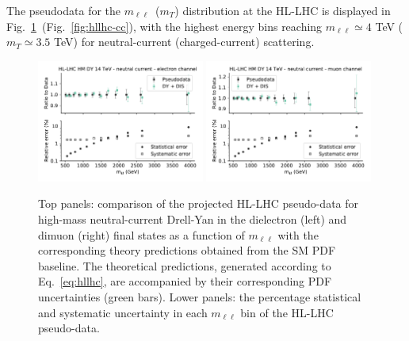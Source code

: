 \documentclass[withindex,glossary]{cam-thesis}
\begin{document}
The pseudodata for the $m_{\ell\ell}$~($m_T$) distribution at the HL-LHC
is displayed in Fig.~\ref{fig:hllhc-nc}~(Fig.~\ref{fig:hllhc-cc}),
with the highest energy bins reaching $m_{\ell\ell}\simeq 4 $ TeV
($m_T\simeq 3.5$ TeV) for neutral-current (charged-current) scattering.

\begin{figure}[t]
\begin{center}
  \includegraphics[width=0.49\textwidth]{dy_figures/HLLHC_HMDY_NC_EL_FINAL_plot_error_breakdown_0.pdf}
  \includegraphics[width=0.49\textwidth]{dy_figures/HLLHC_HMDY_NC_MU_FINAL_plot_error_breakdown_0.pdf}
  \caption{\label{fig:hllhc-nc} Top panels: comparison  of the
    projected HL-LHC pseudo-data for high-mass neutral-current Drell-Yan in the dielectron (left)
    and dimuon (right) final states
    as a function of $m_{\ell\ell}$ with
    the corresponding theory predictions obtained from the SM PDF
    baseline. The theoretical predictions, generated according to
    Eq.~\eqref{eq:hllhc}, are accompanied by their corresponding PDF
    uncertainties (green bars). 
    Lower panels: the percentage statistical and systematic uncertainty in each  $m_{\ell\ell}$ bin
    of the HL-LHC pseudo-data.
    }
\end{center}
\end{figure}
\end{document}
